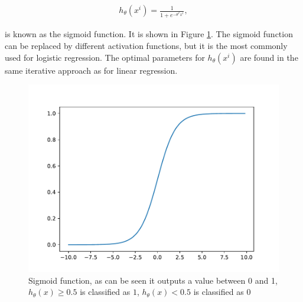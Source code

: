             \begin{align}
                h_\theta(x^i) = \frac{1}{1+e^{-\theta^Tx^i}},
                \label{logreg:h1}
            \end{align}
            
            is known as the sigmoid function. It is shown in Figure \ref{fig:sigmoid}. The sigmoid function can be replaced by different activation functions, but it is the most commonly used for logistic regression. The optimal parameters for $h_\theta(x^i)$ are found in the same iterative approach as for linear regression. 
                
            \begin{figure}
                \centering
                \includegraphics[scale = 0.7]{figures/machineLearning/sigmoid.pdf}
                \caption{Sigmoid function, as can be seen it outputs a value between 0 and 1, $h_\theta(x) \geq 0.5$ is classified as $1$, $h_\theta(x) < 0.5$ is classified as $0$}
                \label{fig:sigmoid}
            \end{figure}
            
            
            
            
